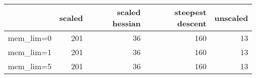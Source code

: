 \documentclass[11pt,a4paper]{report}
\begin{document}
\begin{tabular}{lrrrr}
	\toprule
	{} &  scaled &  scaled hessian &  steepest descent &  unscaled \\
	\midrule
	mem\_lim=0 &     201 &              36 &               160 &        13 \\
	mem\_lim=1 &     201 &              36 &               160 &        13 \\
	mem\_lim=5 &     201 &              36 &               160 &        13 \\
	\bottomrule
\end{tabular}
\end{document}
